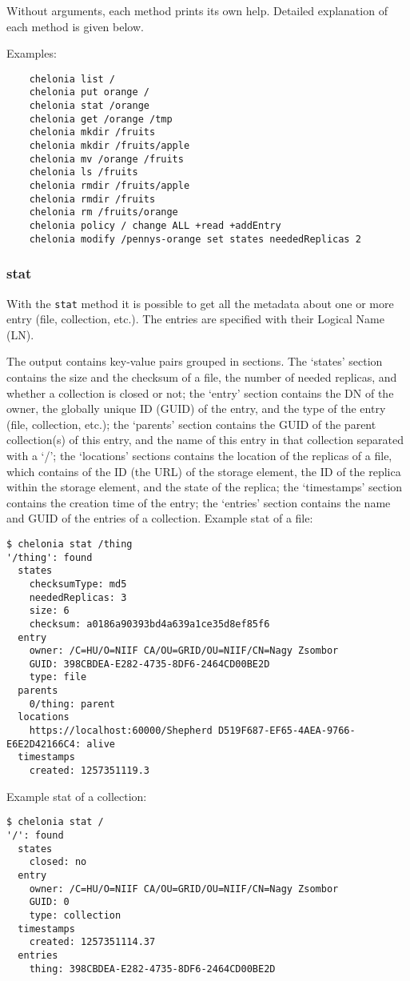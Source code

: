 
Without arguments, each method prints its own help. Detailed explanation of each method is given below.

Examples:
\begin{verbatim}
    chelonia list /
    chelonia put orange /
    chelonia stat /orange
    chelonia get /orange /tmp
    chelonia mkdir /fruits
    chelonia mkdir /fruits/apple
    chelonia mv /orange /fruits
    chelonia ls /fruits
    chelonia rmdir /fruits/apple
    chelonia rmdir /fruits
    chelonia rm /fruits/orange
    chelonia policy / change ALL +read +addEntry
    chelonia modify /pennys-orange set states neededReplicas 2
\end{verbatim}

\subsubsection{stat} %
\label{ssub:stat}
With the \texttt{stat} method it is possible to get all the metadata about one or more entry (file, collection, etc.). The entries are specified with their Logical Name (LN).
\hspace*{0.5cm}
\begin{shaded}
\end{shaded}

The output contains key-value pairs grouped in sections. The `states' section contains the size and the checksum of a file, the number of needed replicas, and whether a collection is closed or not; the `entry' section contains the DN of the owner, the globally unique ID (GUID) of the entry, and the type of the entry (file, collection, etc.); the `parents' section contains the GUID of the parent collection(s) of this entry, and the name of this entry in that collection separated with a `/'; the `locations' sections contains the location of the replicas of a file, which contains of the ID (the URL) of the storage element, the ID of the replica within the storage element, and the state of the replica; the `timestamps' section contains the creation time of the entry; the `entries' section contains the name and GUID of the entries of a collection.
Example stat of a file:
\begin{verbatim}
$ chelonia stat /thing
'/thing': found
  states
    checksumType: md5
    neededReplicas: 3
    size: 6
    checksum: a0186a90393bd4a639a1ce35d8ef85f6
  entry
    owner: /C=HU/O=NIIF CA/OU=GRID/OU=NIIF/CN=Nagy Zsombor
    GUID: 398CBDEA-E282-4735-8DF6-2464CD00BE2D
    type: file
  parents
    0/thing: parent
  locations
    https://localhost:60000/Shepherd D519F687-EF65-4AEA-9766-E6E2D42166C4: alive
  timestamps
    created: 1257351119.3
\end{verbatim}
Example stat of a collection:
\begin{verbatim}
$ chelonia stat /
'/': found
  states
    closed: no
  entry
    owner: /C=HU/O=NIIF CA/OU=GRID/OU=NIIF/CN=Nagy Zsombor
    GUID: 0
    type: collection
  timestamps
    created: 1257351114.37
  entries
    thing: 398CBDEA-E282-4735-8DF6-2464CD00BE2D    
\end{verbatim}

